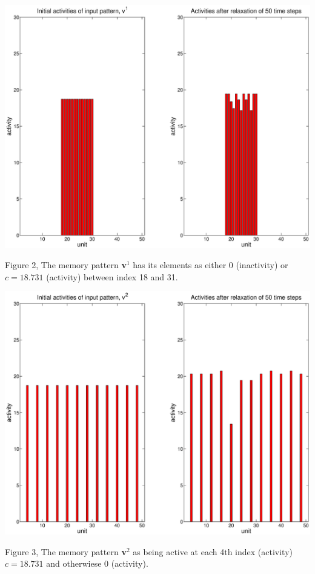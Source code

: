 \documentclass{article}
\begin{document}
\begin{center}
\includegraphics[width=\textwidth]{memory_v1.eps}
\begin{footnotesize}
 Figure 2, The memory pattern \textbf{v}$^1$ has its elements as either 0 (inactivity) or $c=18.731$ (activity) between index 18 and 31. 
\end{footnotesize}
\end{center}

\begin{center}
\includegraphics[width=\textwidth]{memory_v2.eps}
\begin{footnotesize}
 Figure 3, The memory pattern \textbf{v}$^2$ as being active at each 4th  index (activity) $c=18.731$ and otherwiese 0 (activity).
\end{footnotesize}
\end{center}
\end{document}
